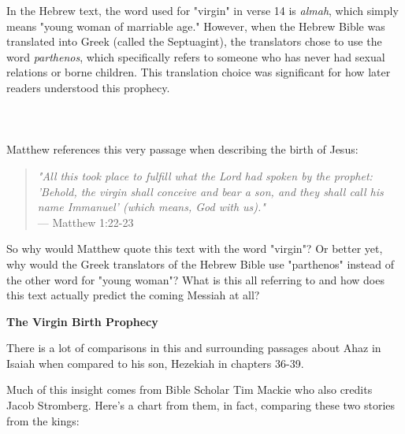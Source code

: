 \documentclass[11pt]{article}
\begin{document}
In the Hebrew text, the word used for "virgin" in verse 14 is \textit{almah}, which simply means "young woman of marriable age." However, when the Hebrew Bible was translated into Greek (called the Septuagint), the translators chose to use the word \textit{parthenos}, which specifically refers to someone who has never had sexual relations or borne children. This translation choice was significant for how later readers understood this prophecy.
\\\\\\\\
Matthew references this very passage when describing the birth of Jesus:
\\
\begin{quote}
\textit{"All this took place to fulfill what the Lord had spoken by the prophet: 'Behold, the virgin shall conceive and bear a son, and they shall call his name Immanuel' (which means, God with us)."} \\
\hfill --- Matthew 1:22-23
\end{quote}
{\vspace{1em}}
So why would Matthew quote this text with the word "virgin"? Or better yet, why would the Greek translators of the Hebrew Bible use "parthenos" instead of the other word for "young woman"? What is this all referring to and how does this text actually predict the coming Messiah at all?


\vspace{3em}
{\large\bfseries The Virgin Birth Prophecy}
\vspace{1em}

There is a lot of comparisons in this and surrounding passages about Ahaz in Isaiah when compared to his son, Hezekiah in chapters 36-39.

Much of this insight comes from Bible Scholar Tim Mackie who also credits Jacob Stromberg. Here's a chart from them, in fact, comparing these two stories from the kings:
\end{document}
